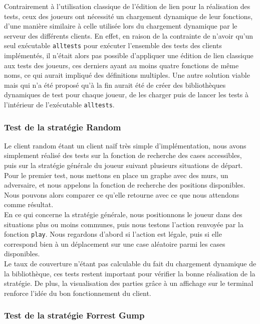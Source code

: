 \documentclass[11pt]{article}
\begin{document}
Contrairement à l'utilisation classique de l'édition de lien pour la réalisation des tests, ceux des joueurs ont nécessité un chargement dynamique de leur fonctions, d'une manière similaire à celle utilisée lors du chargement dynamique par le serveur des différents clients. En effet, en raison de la contrainte de n'avoir qu'un seul exécutable \texttt{alltests} pour exécuter l'ensemble des tests des clients implémentés, il n'était alors pas possible d'appliquer une édition de lien classique aux tests des joueurs, ces derniers ayant au moins quatre fonctions de même noms, ce qui aurait impliqué des définitions multiples. Une autre solution viable mais qui n'a été proposé qu'à la fin aurait été de créer des bibliothèques dynamiques de test pour chaque joueur, de les charger puis de lancer les tests à l'intérieur de l'exécutable \texttt{alltests}.

\subsubsection{Test de la stratégie Random}

Le client random étant un client naïf très simple d'implémentation, nous avons simplement réalisé des tests sur la fonction de recherche des cases accessibles, puis sur la stratégie générale du joueur suivant plusieurs situations de départ. \\

Pour le premier test, nous mettons en place un graphe avec des murs, un adversaire, et nous appelons la fonction de recherche des positions disponibles. Nous pouvons alors comparer ce qu'elle retourne avec ce que nous attendons comme résultat. \\

En ce qui concerne la stratégie générale, nous positionnons le joueur dans des situations plus ou moins communes, puis nous testons l'action renvoyée par la fonction \texttt{play}. Nous regardons d'abord si l'action est légale, puis si elle correspond bien à un déplacement sur une case aléatoire parmi les cases disponibles. \\

Le taux de couverture n'étant pas calculable du fait du chargement dynamique de la bibliothèque, ces tests restent important pour vérifier la bonne réalisation de la stratégie. De plus, la visualisation des parties grâce à un affichage sur le terminal renforce l'idée du bon fonctionnement du client.

\subsubsection{Test de la stratégie Forrest Gump}
\end{document}

